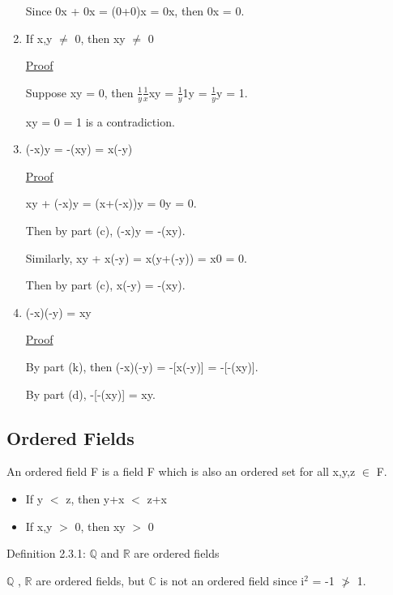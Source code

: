 \begin{enumerate}[label=(\alph*), leftmargin=2cm, itemsep=0.4em]
				Since 0x + 0x = (0+0)x = 0x, then 0x = 0.
	
		\item If x,y $\not =$ 0, then xy $\not =$ 0

			{ \color{magenta} \underline{Proof} } 
		
				Suppose xy = 0, then $\frac{1}{y}\frac{1}{x}$xy
				= $\frac{1}{y}$1y = $\frac{1}{y}$y = 1.

				xy = 0 = 1 is a contradiction.
	
		\item (-x)y = -(xy) = x(-y)

			{ \color{magenta} \underline{Proof} } 
		
				xy + (-x)y = (x+(-x))y = 0y = 0.

				Then by part (c), (-x)y = -(xy).

				Similarly, xy + x(-y) = x(y+(-y)) = x0 = 0.
	
				Then by part (c), x(-y) = -(xy).

		\item (-x)(-y) = xy

			{ \color{magenta} \underline{Proof} } 
		
				By part (k), then (-x)(-y) = -[x(-y)] = -[-(xy)].

				By part (d), -[-(xy)] = xy.
	\end{enumerate}





\subsection{Ordered Fields}

	\qquad An ordered field F is a field F which is also an ordered set for all x,y,z $\in$ F.

	\begin{itemize}[leftmargin=2cm, itemsep=0.4em]
		\item If y $<$ z, then y+x $<$ z+x
	
		\item If x,y $>$ 0, then xy $>$ 0
	\end{itemize}

\newpage

{ \color{blue} Definition 2.3.1: $ \mathbb{Q} $ and $ \mathbb{R} $ are ordered fields } 

	\qquad $ \mathbb{Q} $ , $ \mathbb{R} $ are ordered fields,
	but $ \mathbb{C} $ is not an ordered field since i$^2$ = -1 $\not >$ 1. \\

